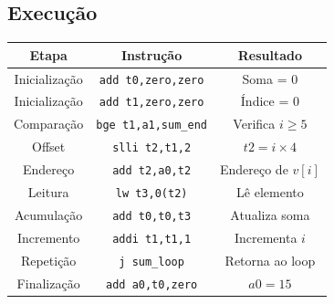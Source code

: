 \documentclass[12pt,a4paper,titlepage]{article}
\begin{document}
\subsection{Execução}
\begin{table}[h]
    \centering
    \begin{tabular}{|c|c|c|}
        \hline
        \textbf{Etapa} & \textbf{Instrução} & \textbf{Resultado} \\ \hline\hline
        Inicialização & \texttt{add t0,zero,zero} & Soma = 0 \\ \hline
        Inicialização & \texttt{add t1,zero,zero} & Índice = 0 \\ \hline
        Comparação & \texttt{bge t1,a1,sum\_end} & Verifica $i \geq 5$ \\ \hline
        Offset & \texttt{slli t2,t1,2} & $t2 = i \times 4$ \\ \hline
        Endereço & \texttt{add t2,a0,t2} & Endereço de $v[i]$ \\ \hline
        Leitura & \texttt{lw t3,0(t2)} & Lê elemento \\ \hline
        Acumulação & \texttt{add t0,t0,t3} & Atualiza soma \\ \hline
        Incremento & \texttt{addi t1,t1,1} & Incrementa $i$ \\ \hline
        Repetição & \texttt{j sum\_loop} & Retorna ao loop \\ \hline
        Finalização & \texttt{add a0,t0,zero} & $a0 = 15$ \\ \hline
    \end{tabular}
\end{table}
\end{document}

